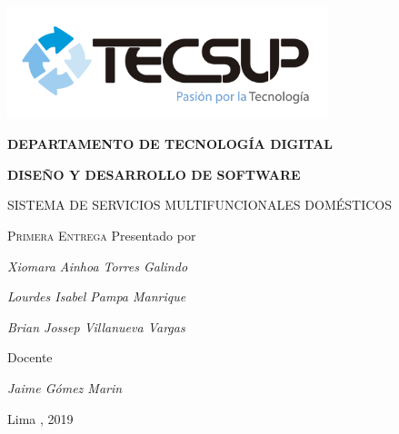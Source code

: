 \begin{titlepage}
	\centering
	\includegraphics[width=0.70\textwidth]{img/logo_tecsup_final}\par\vspace{1cm}
	\vspace{0.30cm}	
	{\scshape\large\bfseries DEPARTAMENTO DE TECNOLOG\'IA DIGITAL \par}
	\vspace{0.60cm}	
	{\scshape\large\bfseries DISEÑO Y DESARROLLO DE SOFTWARE  \par}
	\vspace{2.00cm}		
	{\large\large SISTEMA DE SERVICIOS MULTIFUNCIONALES DOMÉSTICOS \par}
	\vspace{0.70cm}
	{\scshape\large Primera Entrega }
	\vspace{0.60cm}
	\vfill
	Presentado por \par
	{\large\itshape { Xiomara Ainhoa Torres Galindo}\par}
	{\large\itshape { Lourdes Isabel Pampa Manrique}\par}
	{\large\itshape { Brian Jossep Villanueva Vargas} \par}
	\vspace{0.30cm}
	\vfill
	Docente \par
	{\large\itshape { Jaime Gómez Marin}\par}
	
  \vspace{0.30cm}
	\vfill
        {\large Lima , 2019 \par}
\end{titlepage}

